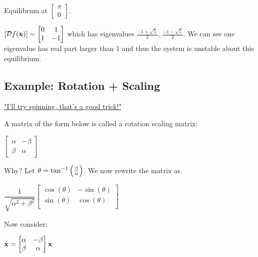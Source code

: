 \documentclass[11pt]{article}
\begin{document}
  \vspace{12pt}

  Equilibrum at \(\begin{bmatrix} \pi \\ 0 \end{bmatrix}\).

  \({\left[ \mathcal{D} f(\mathbf{x}) \right]} =
  \begin{bmatrix}
    0 & 1 \\
    1 & -1
  \end{bmatrix}\) which has eigenvalues \(\frac{-1 + \sqrt{5}}{2},\, \frac{-1 - \sqrt{5}}{2}\). We can see one eigenvalue
  has real part larger than 1 and thus the system is unstable about this equilibrium.

  \pagebreak

  \subsection{Example: Rotation + Scaling}

  \href{https://www.youtube.com/watch?v=uBlhgAkJBos}{"I'll try spinning, that's a good trick!"}

  A matrix of the form below is called a rotation scaling matrix:

  \(\begin{bmatrix}
    \alpha & -\beta \\
    \beta & \alpha
  \end{bmatrix}\)

  Why? Let \(\theta = \tan^{-1}{\left( \frac{\beta}{\alpha} \right)}\). We now rewrite the matrix as.

  \(\dfrac{1}{\sqrt{\alpha^2 + \beta^2}}
  \begin{bmatrix}
    \cos(\theta) & -\sin(\theta) \\
    \sin(\theta) & \cos(\theta) \\
  \end{bmatrix}\)

  \vspace{12pt}

  Now consider:

  \(\dot{\mathbf{x}} =
  \begin{bmatrix}
    \alpha & -\beta \\
    \beta & \alpha
  \end{bmatrix}\mathbf{x}\)
\end{document}
